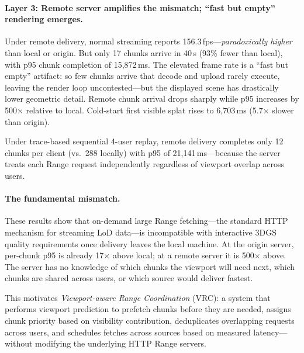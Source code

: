 \paragraph{Layer 3: Remote server amplifies the mismatch; ``fast but empty'' rendering emerges.}
Under remote delivery, normal streaming reports 156.3\,fps---\emph{paradoxically higher} than local or origin.
But only 17 chunks arrive in 40\,s (93\% fewer than local), with p95 chunk completion of 15{,}872\,ms.
The elevated frame rate is a ``fast but empty'' artifact: so few chunks arrive that decode and upload rarely execute, leaving the render loop uncontested---but the displayed scene has drastically lower geometric detail.
Remote chunk arrival drops sharply while p95 increases by 500$\times$ relative to local.
Cold-start first visible splat rises to 6{,}703\,ms (5.7$\times$ slower than origin).

Under trace-based sequential 4-user replay, remote delivery completes only 12 chunks per client (vs.\ 288 locally) with p95 of 21{,}141\,ms---because the server treats each Range request independently regardless of viewport overlap across users.

\paragraph{The fundamental mismatch.}
These results show that on-demand large Range fetching---the standard HTTP mechanism for streaming LoD data---is incompatible with interactive 3DGS quality requirements once delivery leaves the local machine.
At the origin server, per-chunk p95 is already 17$\times$ above local; at a remote server it is 500$\times$ above.
The server has no knowledge of which chunks the viewport will need next, which chunks are shared across users, or which source would deliver fastest.

This motivates \emph{Viewport-aware Range Coordination} (VRC): a system that performs viewport prediction to prefetch chunks before they are needed, assigns chunk priority based on visibility contribution, deduplicates overlapping requests across users, and schedules fetches across sources based on measured latency---without modifying the underlying HTTP Range servers.
